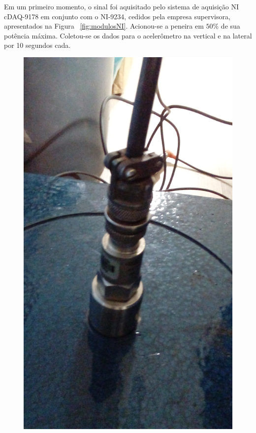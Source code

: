 \documentclass[
	12pt,				%
	openright,			%
	twoside,			%
	a4paper,			%
	english,			%
	french,				%
	spanish,			%
	brazil,				%
	]{abntex2}
\begin{document}
		Em um primeiro momento, o sinal foi aquisitado pelo sistema de aquisição NI	cDAQ-9178 em conjunto com o NI-9234, cedidos pela empresa supervisora, apresentados na Figura ~\ref{fig:modulosNI}. Acionou-se a peneira em $50\%$ de sua potência máxima. Coletou-se os dados para o acelerômetro na vertical e na lateral por 10 segundos cada.

		\begin{figure}[!ht]
			\centering
			\begin{minipage}{0.4\linewidth}
				\centering
				\includegraphics[width = \linewidth, angle = 270, origin = c]{../Fotos/accVertical.jpg}

\end{minipage}
\end{figure}
\end{document}
